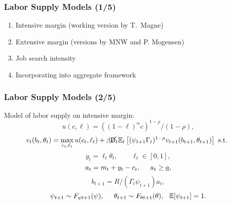 \documentclass[11pt]{beamer}
\newcommand{\E}{\mathbb{E}}
\newcommand{\Die}{\mathsf{D}}
\newcommand{\Live}{\cancel{\Die}}
\begin{document}
\begin{frame}
\frametitle{Labor Supply Models (1/5)}

\begin{enumerate}
\item Intensive margin (working version by T.\ Magne)

\item Extensive margin (versions by MNW and P. Mogensen)

\item Job search intensity

\item Incorporating into aggregate framework

\end{enumerate}
\end{frame}


\begin{frame}
\frametitle{Labor Supply Models (2/5)}
Model of labor supply on intensive margin:
\begin{equation*}
u(c,\ell) = ((1-\ell)^\alpha c)^{1-\rho}/(1-\rho),
\end{equation*}
\begin{equation*}
v_t(b_t,\theta_t) = \max_{c_t, \ell_t} u(c_t,\ell_t) + \beta \Live_t \E_t \left[(\psi_{t+1} \Gamma_t)^{1-\rho} v_{t+1}(b_{t+1},\theta_{t+1}) \right] \text{ s.t. }
\end{equation*}
\begin{equation*}
y_t = \ell_t \theta_t, \qquad \ell_t \in [0,1],
\end{equation*}
\begin{equation*}
a_t = m_t + y_t - c_t, \hspace{0.5cm} a_t \geq \underline{a},
\end{equation*}
\begin{equation*}
b_{t+1} = R/(\Gamma_t \psi_{t+1}) a_t, 
\end{equation*}
\begin{equation*}
\psi_{t+1} \sim F_{\psi t+1}(\psi), \hspace{0.5cm} \theta_{t+1} \sim F_{\theta t+1}(\theta), \hspace{0.25cm} \E[\psi_{t+1}] = 1.
\end{equation*}
\end{frame}
\end{document}
